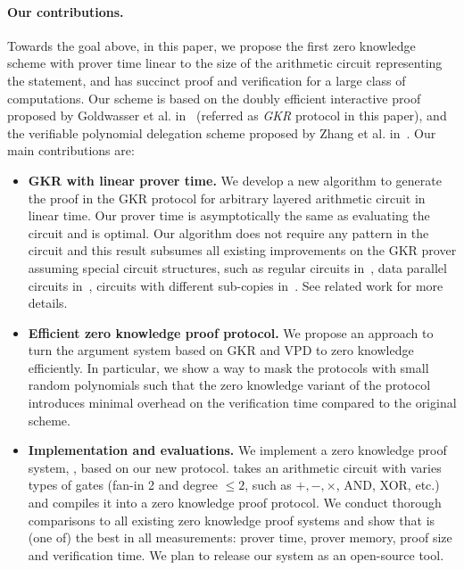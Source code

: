 \paragraph{Our contributions.} Towards the goal above, in this paper, we propose the first zero knowledge scheme with prover time linear to the size of the arithmetic circuit representing the statement, and has succinct proof and verification for a large class of computations. Our scheme is based on the doubly efficient interactive proof proposed by Goldwasser et al. in~\cite{GKR} (referred as \emph{GKR} protocol in this paper), and the verifiable polynomial delegation scheme proposed by Zhang et al. in~\cite{zhang2017vsql}. Our main contributions are:
\begin{itemize}
	\item \textbf{GKR with linear prover time.} We develop a new algorithm to generate the proof in the GKR protocol for arbitrary layered arithmetic circuit in linear time. Our prover time is asymptotically the same as evaluating the circuit and is optimal. Our algorithm does not require any pattern in the circuit and this result subsumes all existing improvements on the GKR prover assuming special circuit structures, such as regular circuits in~\cite{t13}, data parallel circuits in~\cite{t13,wahby2017full}, circuits with different sub-copies in~\cite{vram}. See related work for more details. 
	\item \textbf{Efficient zero knowledge proof protocol.} We propose an approach to turn the argument system based on GKR and VPD to zero knowledge efficiently. In particular, we show a way to mask the protocols with small random polynomials such that the zero knowledge variant of the protocol introduces minimal overhead on the verification time compared to the original scheme. 
	\item \textbf{Implementation and evaluations.}  We implement a zero knowledge proof system, \name, based on our new protocol. \name takes an arithmetic circuit with varies types of gates (fan-in 2 and degree $\le 2$, such as $+,-,\times$, AND, XOR, etc.) and compiles it into a zero knowledge proof protocol. We conduct thorough comparisons to all existing zero knowledge proof systems and show that \name is (one of) the best in all measurements: prover time, prover memory, proof size and verification time. We plan to release our system as an open-source tool.

\end{itemize}


